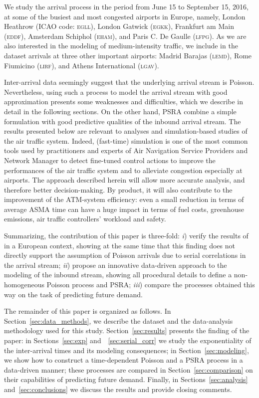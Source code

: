 \documentclass[]{elsarticle}
\newcommand{\airp}[1]{\textcolor{#1}{\textsc{#1}}}
\begin{document}
We study the arrival process in the period from June 15 to September 15, 2016, at some of the busiest and most congested airports in Europe, namely, London Heathrow (\ac{ICAO} code: \airp{egll}), London Gatwick (\airp{egkk}), Frankfurt am Main (\airp{eddf}), Amsterdam Schiphol (\airp{eham}), and Paris C. De Gaulle (\airp{lfpg}).
As we are also interested in the modeling of medium-intensity traffic, we include in the dataset arrivals at three other important airports: Madrid Barajas (\airp{lemd}), Rome Fiumicino (\airp{lirf}), and Athens International (\airp{lgav}).

Inter-arrival data seemingly suggest that the underlying arrival stream is Poisson.
Nevertheless, using such a process to model the arrival stream with good approximation presents some weaknesses and difficulties, which we describe in detail in the following sections.
On the other hand, \ac{PSRA} combine a simple formulation with good predictive qualities of the inbound arrival stream.
The results presented below are relevant to analyses and simulation-based studies of the air traffic system.
Indeed, (fast-time) simulation is one of the most common tools used by practitioners and experts of Air Navigation Service Providers and Network Manager to detect fine-tuned control actions to improve the performances of the air traffic system and to alleviate congestion especially at airports.
The approach described herein will allow more accurate analysis, and therefore better decision-making.
By product, it will also contribute to the improvement of the ATM-system efficiency: even a small reduction in terms of average ASMA time can have a huge impact in terms of fuel costs, greenhouse emissions, air traffic controllers' workload and safety.

Summarizing, the contribution of this paper is three-fold:
\emph{i}) verify the results of~\cite{willemain2004statistical} in a European context, showing at the same time that this finding does not directly support the assumption of Poisson arrivals due to serial correlations in the arrival stream;
\emph{ii}) propose an innovative data-driven approach to the modeling of the inbound stream, showing all procedural details to define a non-homogeneous Poisson process and \ac{PSRA};
\emph{iii}) compare the processes obtained this way on the task of predicting future demand.

The remainder of this paper is organized as follows.
In Section~\ref{sec:data_methods}, we describe the dataset and the data-analysis methodology used for this study.
Section~\ref{sec:results} presents the finding of the paper:
in Sections~\ref{sec:exp} and~~\ref{sec:serial_corr} we study the exponentiality of the inter-arrival times and its modeling consequences; in Section~\ref{sec:modeling}, we show how to construct a time-dependent Poisson and a \ac{PSRA} process in a data-driven manner; these processes are compared in Section~\ref{sec:comparison} on their capabilities of predicting future demand.
Finally, in Sections~\ref{sec:analysis} and~\ref{sec:conclusions} we discuss the results and provide closing comments.
\end{document}
